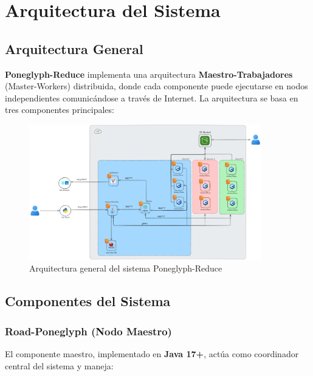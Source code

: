 \section{Arquitectura del Sistema}

\subsection{Arquitectura General}

\textbf{Poneglyph-Reduce} implementa una arquitectura \textbf{Maestro-Trabajadores} (Master-Workers) distribuida, donde cada componente puede ejecutarse en nodos independientes comunicándose a través de Internet. La arquitectura se basa en tres componentes principales:

\begin{figure}[H]
  \centering
  \includegraphics[width=0.9\textwidth]{Figures/0. General/Diagrama Arquitectura.png}
  \caption{Arquitectura general del sistema Poneglyph-Reduce}
  \label{fig:architecture}
\end{figure}

\subsection{Componentes del Sistema}

\subsubsection{Road-Poneglyph (Nodo Maestro)}

El componente maestro, implementado en \textbf{Java 17+}, actúa como coordinador central del sistema y maneja:

